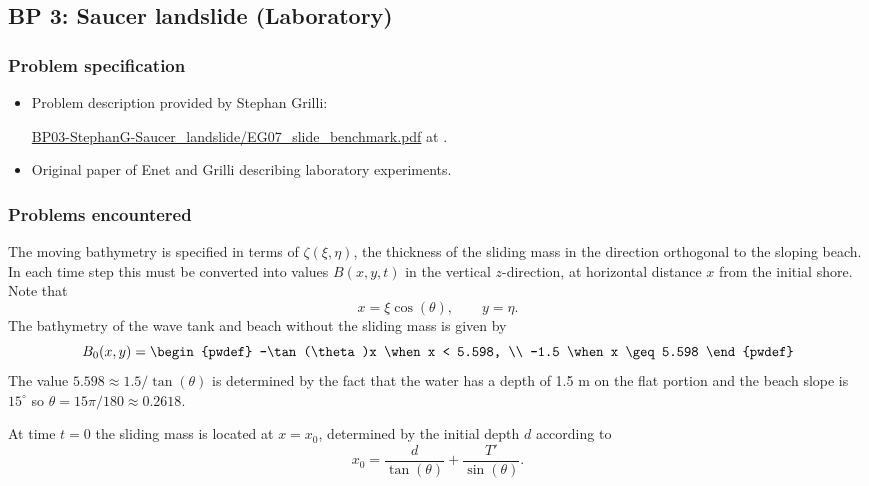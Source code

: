 \newsection
\subsection{BP 3:    
 Saucer landslide (Laboratory)}\label{sec:bp3}

\subsubsection{Problem specification}

\begin{itemize}


\item Problem description provided by Stephan Grilli:

\href{https://github.com/rjleveque/nthmp-benchmark-problems/blob/master/BP03-StephanG-Saucer_landslide/EG07_slide_benchmark.pdf}
{BP03-StephanG-Saucer\_landslide/EG07\_slide\_benchmark.pdf} 
at \cite{bp-description}.  

\item Original paper of Enet and Grilli \cite{EnetGrilli}
describing laboratory experiments.

\end{itemize} 

\subsubsection{Problems encountered}

The moving bathymetry is specified in terms of $\zeta(\xi,\eta)$,
the thickness of the sliding mass 
in the direction orthogonal to the sloping beach.  In each time step this must
be converted into values $B(x,y,t)$ in the vertical $z$-direction, 
at horizontal distance $x$ from the initial shore.  Note that
\[
x = \xi \cos(\theta), \qquad y = \eta.
\]
The bathymetry of the wave tank and beach without the sliding mass is given by
\[
B_0(x,y) = \begin{pwdef} 
  -\tan(\theta)x \when x < 5.598, \\
  -1.5 \when x \geq 5.598 \end{pwdef}
\]
The value $5.598 \approx 1.5 / \tan(\theta)$ is determined by the fact that the
water has a depth of 1.5 m on the flat portion and the beach slope is
$15^\circ$ so $\theta = 15\pi/180 \approx 0.2618$.

At time $t=0$ the sliding mass is located at $x=x_0$, determined by the
initial depth $d$ according to
\[
x_0 = \frac{d}{\tan(\theta)} + \frac{T'}{\sin(\theta)}.
\]

